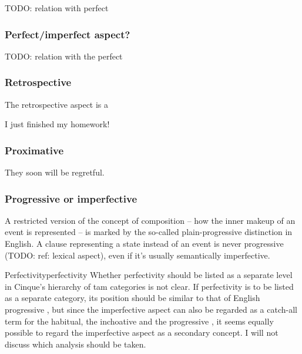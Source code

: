 \documentclass[UTF8, a4paper, oneside, scheme=plain, 12pt]{ctexbook}
\newcommand*{\citesec}[1]{\S~{#1}}
\newcommand*{\citepage}[1]{p.~{#1}}
\begin{document}
TODO: relation with perfect 

\subsubsection{Perfect/imperfect aspect?}

TODO: relation with the perfect

\subsubsection{Retrospective}

The retrospective aspect is a 
\begin{exe}
    \ex I just finished my homework!
\end{exe}

\subsubsection{Proximative}

\begin{exe}
    \ex They soon will be regretful.
\end{exe}

\subsubsection{Progressive or imperfective}

A restricted version of the concept of composition 
-- how the inner makeup of an event is represented \citep[\citesec{19.10}]{dixon2012basic3} -- 
is marked by the so-called plain-progressive distinction in English.
A clause representing a state instead of an event 
is never progressive (TODO: ref: lexical aspect),
even if it's usually semantically imperfective.


\begin{infobox}{Perfectivity}{perfectivity}
    Whether perfectivity should be listed as a separate level 
    in Cinque's hierarchy of \acs{tam} categories is not clear. 
    If perfectivity is to be listed as a separate category,
    its position should be similar to that of English progressive \citet{pearce2015completing},
    but since the imperfective aspect 
    can also be regarded as a catch-all term 
    for the habitual, the inchoative and the progressive \citep[\citepage{255}]{van2011tense},
    it seems equally possible to regard the imperfective aspect 
    as a secondary concept. 
    I will not discuss which analysis should be taken.
\end{infobox}
\end{document}
